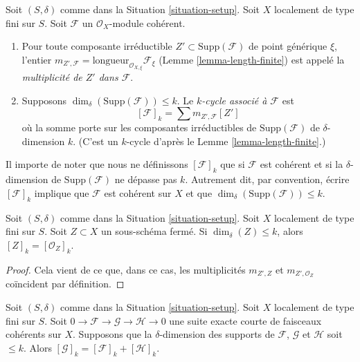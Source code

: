 \begin{definition}
\label{definition-cycle-associated-to-coherent-sheaf}
Soit $(S, \delta)$ comme dans la Situation \ref{situation-setup}.
Soit $X$ localement de type fini sur $S$.
Soit $\mathcal{F}$ un $\mathcal{O}_X$-module cohérent.
\begin{enumerate}
\item Pour toute composante irréductible $Z' \subset \text{Supp}(\mathcal{F})$
de point générique $\xi$, l'entier
$m_{Z', \mathcal{F}} = \text{longueur}_{\mathcal{O}_{X, \xi}} \mathcal{F}_\xi$
(Lemme \ref{lemma-length-finite})
est appelé la {\it multiplicité de $Z'$ dans $\mathcal{F}$}.
\item Supposons $\dim_\delta(\text{Supp}(\mathcal{F})) \leq k$.
Le {\it $k$-cycle associé à $\mathcal{F}$} est
$$
[\mathcal{F}]_k
=
\sum m_{Z', \mathcal{F}}[Z']
$$
où la somme porte sur les composantes irréductibles de
$\text{Supp}(\mathcal{F})$ de $\delta$-dimension $k$.
(C'est un $k$-cycle d'après le Lemme \ref{lemma-length-finite}.)
\end{enumerate}
\end{definition}

\noindent
Il importe de noter que nous ne définissons $[\mathcal{F}]_k$
que si $\mathcal{F}$ est cohérent et si la $\delta$-dimension
de $\text{Supp}(\mathcal{F})$ ne dépasse pas $k$. Autrement dit,
par convention, écrire $[\mathcal{F}]_k$ implique que
$\mathcal{F}$ est cohérent sur $X$ et que
$\dim_\delta(\text{Supp}(\mathcal{F})) \leq k$.

\begin{lemma}
\label{lemma-cycle-closed-coherent}
Soit $(S, \delta)$ comme dans la Situation \ref{situation-setup}.
Soit $X$ localement de type fini sur $S$.
Soit $Z \subset X$ un sous-schéma fermé.
Si $\dim_\delta(Z) \leq k$, alors $[Z]_k = [{\mathcal O}_Z]_k$.
\end{lemma}

\begin{proof}
Cela vient de ce que, dans ce cas, les multiplicités $m_{Z', Z}$ et
$m_{Z', \mathcal{O}_Z}$ coïncident par définition.
\end{proof}

\begin{lemma}
\label{lemma-additivity-sheaf-cycle}
Soit $(S, \delta)$ comme dans la Situation \ref{situation-setup}.
Soit $X$ localement de type fini sur $S$.
Soit $0 \to \mathcal{F} \to \mathcal{G} \to \mathcal{H} \to 0$
une suite exacte courte de faisceaux cohérents sur $X$.
Supposons que la $\delta$-dimension des supports
de $\mathcal{F}$, $\mathcal{G}$ et $\mathcal{H}$ soit $\leq k$.
Alors $[\mathcal{G}]_k = [\mathcal{F}]_k + [\mathcal{H}]_k$.
\end{lemma}

